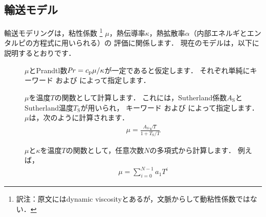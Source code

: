 \subsection{輸送モデル}
\label{ssec:7.1.2@3.0.1}
輸送モデリングは，粘性係数%
\footnote{訳注：原文にはdynamic viscosityとあるが，文脈からして動粘性係数ではない．}%
$\mu$，熱伝導率$\kappa$，熱拡散率$\alpha$（内部エネルギとエンタルピの方程式に用いられる）の
評価に関係します．
現在のモデルは，以下に説明するとおりです．
\begin{description}
 \item[]
            $\mu$とPrandtl数$\mathord{\mathit{Pr}} = c_{\mathrm{p}}\mu/\kappa$が一定であると仮定します．
            それぞれ単純にキーワード
%
%
            および
%
%
            によって指定します．
 \item[]
            $\mu$を温度$T$の関数として計算します．
            これには，Sutherland係数$A_{\mathrm{S}}$とSutherland温度$T_{\mathrm{S}}$が用いられ，
            キーワード
%
%
            および
%
%
            によって指定します．
            $\mu$は，次のように計算されます．
\begin{align}
 \label{eq:7.2}
 \mu = \frac{A_{\mathrm{S}}\sqrt{T}}{1 + T_{\mathrm{S}}/T}
\end{align}
 \item[]
            $\mu$と$\kappa$を温度$T$の関数として，任意次数$N$の多項式から計算します．
            例えば，
\begin{align}
 \label{eq:7.2@3.0.1}
 \mu = \sum^{N-1}_{i=0}a_{1}T^{i}
\end{align}
\end{description}


